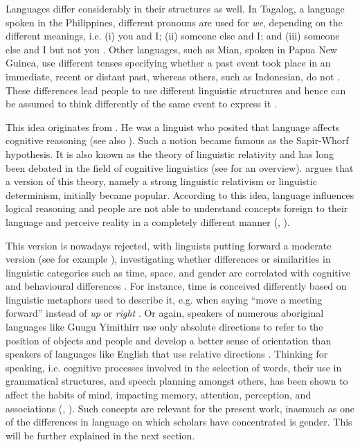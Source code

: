 Languages differ considerably in their structures as well. In Tagalog, a language spoken in the Philippines, different pronouns are used for \textit{we}, depending on the different meanings, i.e. (i) you and I; (ii) someone else and I; and (iii) someone else and I but not you \citep[15]{deutscher2010through}. Other languages, such as Mian, spoken in Papua New Guinea, use different tenses specifying whether a past event took place in an immediate, recent or distant past, whereas others, such as Indonesian, do not \citep[64]{boroditsky2001does}. These differences lead people to use different linguistic structures and hence can be assumed to think differently of the same event to express it \citep[64]{boroditsky2011language}. 

This idea originates from \textcite{whorf1956language}. He was a linguist who posited that language affects cognitive reasoning (see also \cite[1014]{pederson2007cognitive}). Such a notion became famous as the Sapir-Whorf hypothesis. It is also known as the theory of linguistic relativity and has long been debated in the field of cognitive linguistics (see \cite{pederson2007cognitive} for an overview). \textcite[72]{kramer2016feminist} argues that a version of this theory, namely a strong linguistic relativism or linguistic determinism, initially became popular. According to this idea, language influences logical reasoning and people are not able to understand concepts foreign to their language and perceive reality in a completely different manner (\cite[21--22]{deutscher2010through}, \cite[72]{kramer2016feminist}). 

This version is nowadays rejected, with linguists putting forward a moderate version (see for example \cite{levinson1994introduction,boroditsky2001does,boroditsky2003sex,phillips2003can,casasanto2008s,prewitt2012gendering,santacreu2013female}), investigating whether differences or similarities in linguistic categories such as time, space, and gender are correlated with cognitive and behavioural differences \citep[72]{kramer2016feminist}. For instance, time is conceived differently based on linguistic metaphors used to describe it, e.g. when saying ``move a meeting forward'' instead of \textit{up} or \textit{right} \citep[7]{boroditsky2001does}. Or again, speakers of numerous aboriginal languages like Guugu Yimithirr use only absolute directions to refer to the position of objects and people and develop a better sense of orientation than speakers of languages like English that use relative directions \citep{levinson1994introduction,boroditsky2011language}. Thinking for speaking, i.e. cognitive processes involved in the selection of words, their use in grammatical structures, and speech planning amongst others, has been shown to affect the habits of mind, impacting memory, attention, perception, and associations (\cite[22]{deutscher2010through}, \cite[72]{kramer2016feminist}). Such concepts are relevant for the present work, inasmuch as one of the differences in language on which scholars have concentrated is gender. This will be further explained in the next section.


